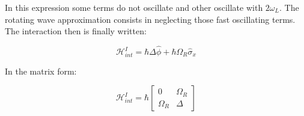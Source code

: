In this expression some terms do not oscillate and other oscillate with $2\omega_{L}$. The rotating wave approximation consists in neglecting those fast oscillating terms. The interaction then is finally written:

\begin{equation}
    \mathcal{H}_{int}^{I} = \hbar \Delta \hat{\phi} + \hbar\Omega_{R} \hat{\sigma}_{x}
\end{equation}

In the matrix form:

\[
\mathcal{H}_{int}^{I} = \hbar
  \begin{bmatrix}
    0 & \Omega_{R}  \\
    \Omega_{R} & \Delta
  \end{bmatrix}
\]